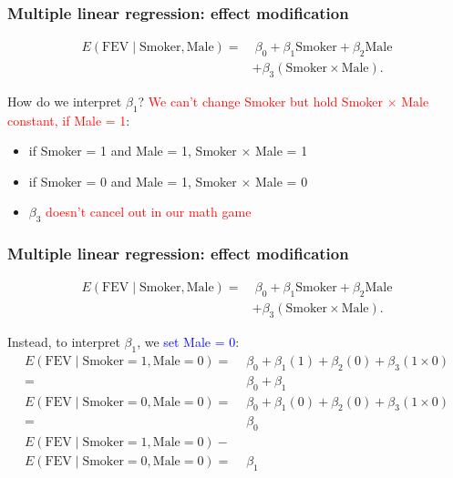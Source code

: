 \documentclass[12pt, 
hyperref={colorlinks=true, linkcolor=blue, urlcolor=cyan}]{beamer}
\begin{document}
\begin{frame}
\frametitle{Multiple linear regression: effect modification}
\begin{align*}
E(\text{FEV} \mid \text{Smoker}, \text{Male}) = & \ \beta_0 + \beta_1 \text{Smoker} + \beta_2 \text{Male}\\
& + \beta_3 (\text{Smoker} \times \text{Male}).
\end{align*}

How do we interpret $\beta_1$? \pause
\textcolor{red}{We can't change Smoker but hold Smoker $\times$ Male constant, if Male = 1}: 
\begin{itemize}
\item if Smoker = 1 and Male = 1, Smoker $\times$ Male = 1
\item if Smoker = 0 and Male = 1, Smoker $\times$ Male = 0
\item $\beta_3$ \textcolor{red}{doesn't cancel out in our math game}
\end{itemize}
\end{frame}

\begin{frame}
\frametitle{Multiple linear regression: effect modification}
\begin{align*}
E(\text{FEV} \mid \text{Smoker}, \text{Male}) = & \ \beta_0 + \beta_1 \text{Smoker} + \beta_2 \text{Male}\\
& + \beta_3 (\text{Smoker} \times \text{Male}).
\end{align*}

Instead, to interpret $\beta_1$, we \textcolor{blue}{set Male = 0}:
{\small \begin{align*}
E(\text{FEV} \mid \text{Smoker} = 1, \text{Male} = 0) =&  \ \beta_0 + \beta_1 (1) + \beta_2 (0) + \beta_3 (1 \times 0) \\
= & \ \beta_0 + \beta_1 \\
E(\text{FEV} \mid \text{Smoker} = 0, \text{Male} = 0) =&  \ \beta_0 + \beta_1 (0) + \beta_2 (0) + \beta_3 (1 \times 0) \\
 =& \ \beta_0 \\
E(\text{FEV} \mid \text{Smoker} = 1, \text{Male} = 0) - \ &\\
E(\text{FEV} \mid \text{Smoker} = 0, \text{Male} = 0) =& \ \beta_1
\end{align*}
}
\end{frame}
\end{document}
